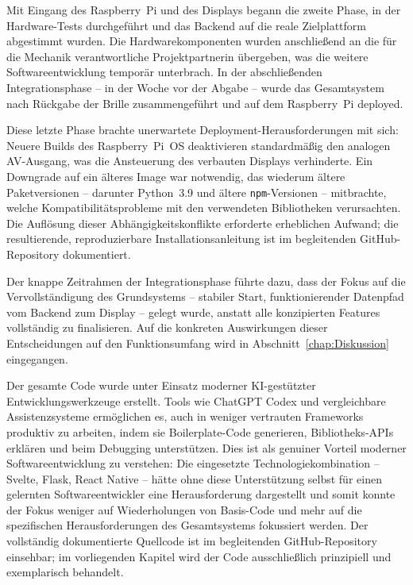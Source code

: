 Mit Eingang des Raspberry~Pi und des Displays begann die zweite Phase, in der
Hardware-Tests durchgeführt und das Backend auf die reale Zielplattform abgestimmt
wurden.
Die Hardwarekomponenten wurden anschließend an die für die Mechanik verantwortliche
Projektpartnerin übergeben, was die weitere Softwareentwicklung temporär unterbrach.
In der abschließenden Integrationsphase -- in der Woche vor der Abgabe -- wurde
das Gesamtsystem nach Rückgabe der Brille zusammengeführt und auf dem Raspberry~Pi
deployed.

Diese letzte Phase brachte unerwartete Deployment-Herausforderungen mit sich:
Neuere Builds des Raspberry~Pi~OS deaktivieren standardmäßig den analogen
AV-Ausgang, was die Ansteuerung des verbauten Displays verhinderte.
Ein Downgrade auf ein älteres Image war notwendig, das wiederum ältere
Paketversionen -- darunter Python~3.9 und ältere \texttt{npm}-Versionen --
mitbrachte, welche Kompatibilitätsprobleme mit den verwendeten Bibliotheken
verursachten.
Die Auflösung dieser Abhängigkeitskonflikte erforderte erheblichen Aufwand;
die resultierende, reproduzierbare Installationsanleitung ist im begleitenden
GitHub-Repository dokumentiert.

Der knappe Zeitrahmen der Integrationsphase führte dazu, dass der Fokus auf
die Vervollständigung des Grundsystems -- stabiler Start, funktionierender
Datenpfad vom Backend zum Display -- gelegt wurde, anstatt alle konzipierten
Features vollständig zu finalisieren.
Auf die konkreten Auswirkungen dieser Entscheidungen auf den Funktionsumfang
wird in Abschnitt~\ref{chap:Diskussion} eingegangen.

Der gesamte Code wurde unter Einsatz moderner KI-gestützter Entwicklungswerkzeuge
erstellt.
Tools wie ChatGPT Codex und vergleichbare Assistenzsysteme ermöglichen es,
auch in weniger vertrauten Frameworks produktiv zu arbeiten, indem sie
Boilerplate-Code generieren, Bibliotheks-APIs erklären und beim Debugging
unterstützen.
Dies ist als genuiner Vorteil moderner Softwareentwicklung zu verstehen:
Die eingesetzte Technologiekombination -- Svelte, Flask, React Native -- hätte ohne diese Unterstützung selbst für einen gelernten Softwareentwickler eine Herausforderung dargestellt und somit konnte der Fokus weniger auf Wiederholungen von Basis-Code und mehr auf die spezifischen Herausforderungen des Gesamtsystems fokussiert werden.
Der vollständig dokumentierte Quellcode ist im begleitenden GitHub-Repository
einsehbar; im vorliegenden Kapitel wird der Code ausschließlich prinzipiell
und exemplarisch behandelt.
\newpage
